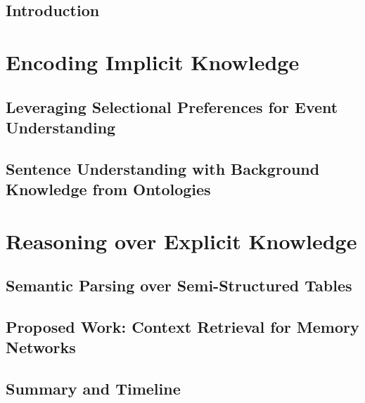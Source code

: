 \documentclass[12pt]{cmuthesis}
\begin{document}
\chapter{Introduction}
\label{chapter:introduction}

\part{Encoding Implicit Knowledge}
\chapter{Leveraging Selectional Preferences for Event Understanding}
\label{chapter:nem}

\chapter{Sentence Understanding with Background Knowledge from Ontologies}
\label{chapter:ontolstm}

\part{Reasoning over Explicit Knowledge}
\chapter{Semantic Parsing over Semi-Structured Tables}
\label{chapter:neural_semantic_parsing}

\chapter{Proposed Work: Context Retrieval for Memory Networks}
\label{chapter:memnet_qa}

\chapter{Summary and Timeline}


%

\backmatter


\renewcommand{\bibsection}{\chapter{\bibname}}

\end{document}
